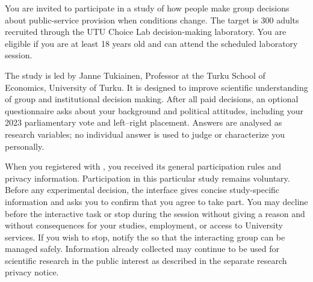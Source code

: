 


You are invited to participate in a study of how people make group decisions about public-service provision when conditions change. The target is 300 adults recruited through the UTU Choice Lab decision-making laboratory. You are eligible if you are at least 18 years old and can attend the scheduled laboratory session.

The study is led by Janne Tukiainen, Professor at the Turku School of Economics, University of Turku. It is designed to improve scientific understanding of group and institutional decision making. After all paid decisions, an optional questionnaire asks about your background and political attitudes, including your 2023 parliamentary vote and left--right placement. Answers are analysed as research variables; no individual answer is used to judge or characterize you personally.

When you registered with , you received its general participation rules and privacy information. Participation in this particular study remains voluntary. Before any experimental decision, the interface gives concise study-specific information and asks you to confirm that you agree to take part.  You may decline before the interactive task or stop during the session without giving a reason and without consequences for your studies, employment, or access to University services. If you wish to stop, notify the  so that the interacting group can be managed safely. Information already collected may continue to be used for scientific research in the public interest as described in the separate research privacy notice. 

